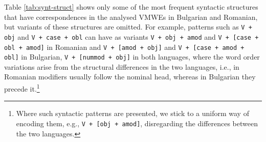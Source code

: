 \documentclass[output=paper,colorlinks,citecolor=brown]{langscibook}
\begin{document}


Table \ref{tab:synt-struct} shows only some of the most frequent syntactic structures that have correspondences in the analysed VMWEs in  Bulgarian and Romanian, but variants of these structures are omitted. For example, patterns such as \texttt{V + obj} and \texttt{V + case + obl} can have as variants \texttt{V + obj + amod} and \texttt{V + [case + obl + amod]} in Romanian and \texttt{V + [amod + obj]} and \texttt{V + [case + amod + obl]} in Bulgarian,  \texttt{V + [nummod + obj]} in both languages, where the word order variations arise from the structural differences in the two languages, i.e., in Romanian modifiers usually follow the nominal head, whereas in Bulgarian they precede it.\footnote{Where such syntactic patterns are presented, we stick to a uniform way of encoding them, e.g., \texttt{V + [obj + amod]}, disregarding the differences between the two languages.}
\end{document}
